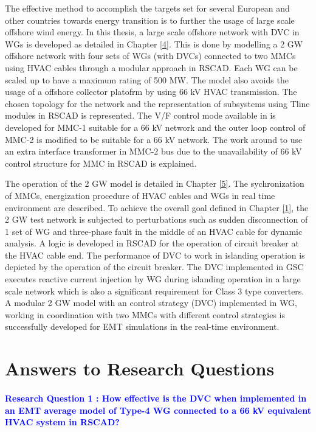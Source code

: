 The effective method to accomplish the targets set for several European and other countries towards energy transition is to further the usage of large scale offshore wind energy. In this thesis, a large scale offshore network with \gls{DVC} in \gls{WG}s is developed as detailed in Chapter \ref{4}. This is done by modelling a 2 GW offshore network with four sets of \gls{WG}s (with \gls{DVC}s) connected to two \gls{MMC}s using \gls{HVAC} cables through a modular approach in RSCAD. Each \gls{WG} can be scaled up to have a maximum rating of 500 MW. The model also avoids the usage of a offshore collector platofrm by using 66 kV \gls{HVAC} transmission. The chosen topology for the network and the representation of subsystems using Tline modules in RSCAD is represented. The V/F control mode available in \cite{wachal2014guide} is developed for \gls{MMC}-1 suitable for a 66 kV network and the outer loop control of \gls{MMC}-2 is modified to be suitable for a 66 kV network. The work around to use an extra interface transformer in \gls{MMC}-2 bus due to the unavailability of 66 kV control structure for \gls{MMC} in RSCAD is explained. 


The operation of the 2 GW model is detailed in Chapter \ref{5}. The sychronization of \gls{MMC}s, energization procedure of \gls{HVAC} cables and \gls{WG}s in real time environment are described. To achieve the overall goal defined in Chapter \ref{1}, the 2 GW test network is subjected to perturbations such as sudden disconnection of 1 set of \gls{WG} and three-phase fault in the middle of an \gls{HVAC} cable for dynamic analysis. A logic is developed in RSCAD for the operation of circuit breaker at the \gls{HVAC} cable end. The performance of \gls{DVC} to work in islanding operation is depicted by the operation of the circuit breaker. The \gls{DVC} implemented in \gls{GSC} executes reactive current injection by \gls{WG} during islanding operation in a large scale network which is also a significant requirement for Class 3 type converters. A modular 2 GW model with an control strategy (\gls{DVC}) implemented in \gls{WG}, working in coordination with two \gls{MMC}s with different control strategies is successfully developed for \gls{EMT} simulations in the real-time environment.   


\section{Answers to Research Questions}
\vspace{2mm}
\paragraph{\textcolor{blue}{Research Question 1 : How effective is the \gls{DVC} when implemented in an \gls{EMT} average model of Type-4 \gls{WG} connected to a 66 kV equivalent \gls{HVAC} system in RSCAD?}}

